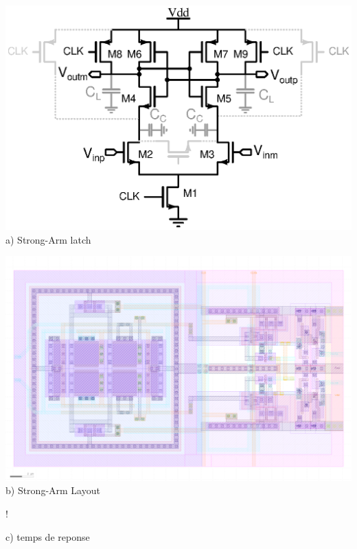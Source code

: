 \begin{mdframed}[linecolor=Prune,linewidth=1]
\begin{center}
    \centering
    \begin{minipage}[b]{0.33\textwidth}
        \centering
        \includegraphics[width=\textwidth]{Abstract/Figs/sa_designed.eps}
        a) Strong-Arm latch
    \end{minipage}
    \begin{minipage}[b]{0.33\textwidth}
        \centering
        \includegraphics[width=\textwidth]{Chapter7/Figs/layout-slow-sa.png}
        b) Strong-Arm Layout
    \end{minipage}
    \begin{minipage}[b]{0.33\textwidth}
        \centering
        \resizebox {\textwidth} {!} { 
            
        }
        c) temps de reponse
    \end{minipage}
    \begin{minipage}[b]{0.33\textwidth}
        \centering

\end{minipage}
\end{center}
\end{mdframed}
